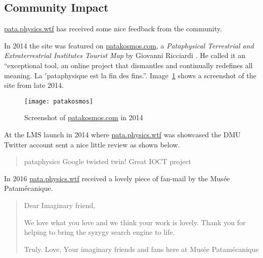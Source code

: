 \subsection{Community Impact}

\url{pata.physics.wtf} has received some nice feedback from the community. 

In 2014 the site was featured on \url{patakosmos.com}, a \textit{Pataphysical Terrestrial and Extraterrestrial Institutes Tourist Map} by Giovanni Ricciardi \citeyear{Ricciardi2014}. He called it an ``exceptional tool, an online project that dismantles and continually redefines all meaning. La $'$pataphysique est la fin des fins.''. Image~\ref{img:patakosmos} shows a screenshot of the site from late 2014.

\begin{figure}[!htbp]
  \centering
  \texttt{[image: patakosmos]}
\caption[\url{patakosmos.com} in 2014]{Screenshot of \url{patakosmos.com} in 2014}
\label{img:patakosmos}
\end{figure}

At the \ac{LMS} launch in 2014 where \url{pata.physics.wtf} was showcased the \ac{DMU} Twitter account sent a nice little review as shown below.

\begin{quotation}
  pataphysics Google twisted twin! Great IOCT project 
\end{quotation}

In 2016 \url{pata.physics.wtf} received a lovely piece of fan-mail by the Mus{\'e}e Patam{\'e}canique.

\begin{quotation}
  Dear Imaginary friend,

  We love what you love and we think your work is lovely. 
  Thank you for helping to bring the syzygy search engine to life.

  Truly. 
  Love,
  Your imaginary friends and fans here at Mus{\'e}e Patam{\'e}canique 
\end{quotation}


\stopcontents[chapters]
